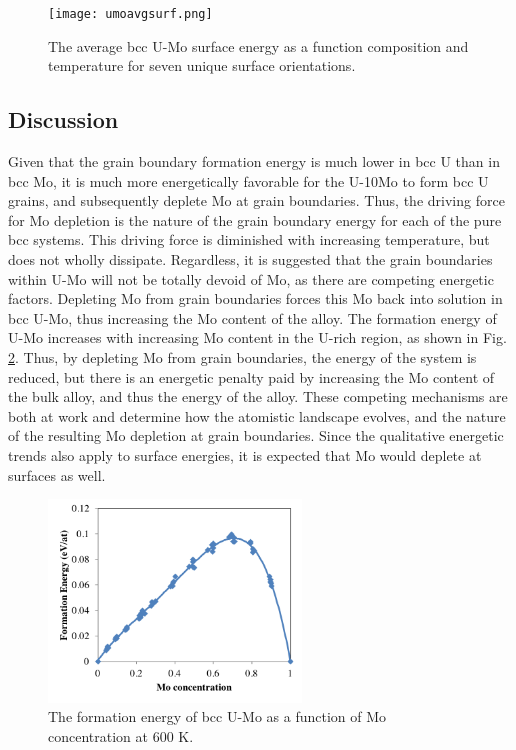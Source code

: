 \documentclass[review]{elsarticle}
\begin{document}
\begin{figure}[h]
 \centering
 \texttt{[image: umoavgsurf.png]} 
 \caption{The average bcc U-Mo surface energy as a function composition and temperature for seven unique surface orientations.}
 \label{fig:avgvsmo}
\end{figure}

\FloatBarrier

\subsection{Discussion}

Given that the grain boundary formation energy is much lower in bcc U than in bcc Mo, it is much more energetically favorable for the U-10Mo to form bcc U grains, and subsequently deplete Mo at grain boundaries. Thus, the driving force for Mo depletion is the nature of the grain boundary energy for each of the pure bcc systems. This driving force is diminished with increasing temperature, but does not wholly dissipate. Regardless, it is suggested that the grain boundaries within U-Mo will not be totally devoid of Mo, as there are competing energetic factors. Depleting Mo from grain boundaries forces this Mo back into solution in bcc U-Mo, thus increasing the Mo content of the alloy. The formation energy of U-Mo increases with increasing Mo content in the U-rich region, as shown in Fig. \ref{fig:umoform}. Thus, by depleting Mo from grain boundaries, the energy of the system is reduced, but there is an energetic penalty paid by increasing the Mo content of the bulk alloy, and thus the energy of the alloy. These competing mechanisms are both at work and determine how the atomistic landscape evolves, and the nature of the resulting Mo depletion at grain boundaries. Since the qualitative energetic trends also apply to surface energies, it is expected that Mo would deplete at surfaces as well.

\begin{figure}[h]
 \centering
 \includegraphics[width=0.6\textwidth]{umoform.png} 
 \caption{The formation energy of bcc U-Mo as a function of Mo concentration at 600 K.}
 \label{fig:umoform}
\end{figure}
\end{document}
